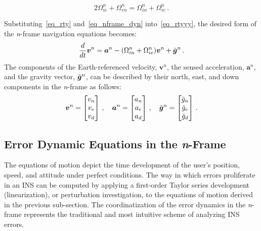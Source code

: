\documentclass[journal]{IEEEtran}
\begin{document}
\begin{equation}\label{eq_rty}
2{{\Omega}}_{ie}^{n}+{\Omega}_{en}^{n}={{\Omega}}_{in}^{n}+{\Omega}_{ie}^{n}\,.
\end{equation}

Substituting~\eqref{eq_rty} and~\eqref{eq_nframe_dyn} into~\eqref{eq_rtyyy}, the desired form of the  \textit{n}-frame navigation equations becomes:
\begin{equation}
    \frac{d}{dt}{\boldsymbol{v}}^n={\boldsymbol{a}}^{n}- ({\Omega}_{in}^{n}+{\Omega}_{ie}^{n}){\boldsymbol{v}}^{n}+{\Bar{\boldsymbol{g}}}^{n} \,.
    \label{eq_nframe_dyn2}
\end{equation}
The components of the Earth-referenced velocity, ${\boldsymbol{v}}^n$, the sensed acceleration, ${\boldsymbol{a}}^{n}$, and the gravity vector, ${\Bar{\boldsymbol{g}}}^{n}$, can be described by their north, east, and down components in the \textit{n}-frame as follows:
\begin{equation}
    {\boldsymbol{v}}^n=\begin{bmatrix}
    {v}_n\\
    {v}_e\\
    {v}_d\\
    \end{bmatrix}\,,\quad
    {\boldsymbol{a}}^{n}=\begin{bmatrix}
    {a}_n\\
    {a}_e\\
    {a}_d\\
     \end{bmatrix}\,,\quad
    {\Bar{\boldsymbol{g}}}^{n}=\begin{bmatrix}
    {\Bar{g}}_n\\
    {\Bar{g}}_e\\
    {\Bar{g}}_d\\ 
    \end{bmatrix}\,.
    \label{eq_compo}
\end{equation}


%
\subsection{Error Dynamic Equations in the \textit{n}-Frame}
The equations of motion  depict the time development of the user's position, speed, and attitude under perfect conditions.
The way in which errors proliferate in an INS can be computed by applying a first-order Taylor series development (linearization), or perturbation investigation, to the equations of motion derived in the previous sub-section. The coordinatization of the error dynamics in the \textit{n}-frame represents the traditional and most intuitive scheme of analyzing INS errors.\\
\end{document}
